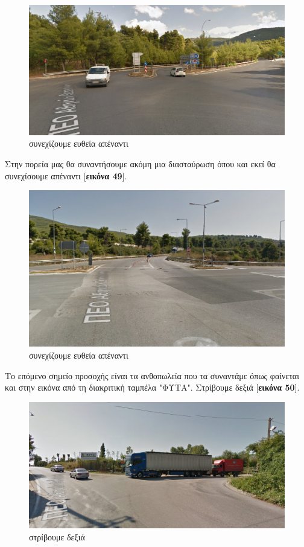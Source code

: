 \begin{figure}[H]
\includegraphics[width=\textwidth]{images/lamia-athina/afidnon/afidnon_024.jpg} 
\caption{συνεχίζουμε ευθεία απέναντι}
\end{figure}
Στην πορεία μας θα συναντήσουμε ακόμη μια διασταύρωση όπου και εκεί θα συνεχίσουμε απέναντι [\textbf{εικόνα 49}].
\begin{figure}[H]
\includegraphics[width=\textwidth]{images/lamia-athina/afidnon/afidnon_025.jpg} 
\caption{συνεχίζουμε ευθεία απέναντι}
\end{figure}
Το επόμενο σημείο προσοχής είναι τα ανθοπωλεία που τα συναντάμε όπως φαίνεται και στην εικόνα από τη διακριτική ταμπέλα "ΦΥΤΑ". Στρίβουμε δεξιά [\textbf{εικόνα 50}].
\begin{figure}[H]
\includegraphics[width=\textwidth]{images/lamia-athina/afidnon/afidnon_026.jpg} 
\caption{στρίβουμε δεξιά}
\end{figure}
